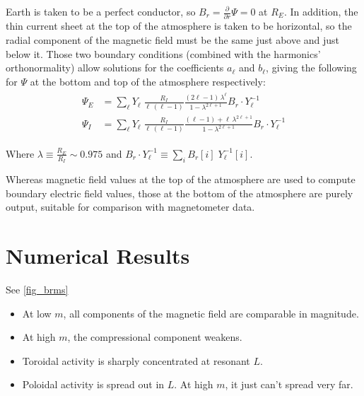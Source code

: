 \documentclass{article}
\newcommand{\dd}[1]{\ensuremath{ \frac{\partial}{\partial #1} }\xspace}
\newcommand{\lr}[1]{ \left( #1 \right) }
\newcommand{\azm}{\ensuremath{m}\xspace}
\begin{document}
Earth is taken to be a perfect conductor, so $B_r = \dd{r} \Psi = 0$ at
$R_E$. In addition, the thin current sheet at the top of the atmosphere
is taken to be horizontal, so the radial component of the magnetic field
must be the same just above and just below it. Those two boundary
conditions (combined with the harmonics' orthonormality) allow solutions
for the coefficients $a_\ell$ and $b_\ell$, giving the
following for $\Psi$ at the bottom and top of the atmosphere
respectively:
\begin{align}
  \label{psi_final}
  \begin{split}
  \Psi_E &= \displaystyle\sum_\ell Y_\ell \; \frac{R_I}{ \ell \, \lr{\ell - 1} } \frac{ \lr{2 \ell - 1} \, \lambda^\ell }{ 1 - \lambda^{2 \ell + 1} } B_r \cdot Y_\ell^{-1} \\
  \Psi_I &= \displaystyle\sum_\ell Y_\ell \; \frac{R_I}{ \ell \, \lr{\ell - 1} } \frac{ \lr{\ell - 1} + \ell \, \lambda^{2 \ell + 1} }{ 1 - \lambda^{2 \ell + 1} } B_r \cdot Y_\ell^{-1}
  \end{split}
\end{align}

Where $\lambda \equiv \frac{R_E}{R_I} \sim \num{0.975}$ and $B_r \cdot Y_\ell^{-1} \equiv \displaystyle\sum_i B_r [i] \; Y_\ell^{-1} \! [i]$. 

Whereas magnetic field values at the top of the atmosphere are used to
compute boundary electric field values, those at the bottom of the
atmosphere are purely output, suitable for comparison with magnetometer
data. 


\section{Numerical Results}

See \cref{fig_brms}

\begin{itemize}
    \item At low \azm, all components of the magnetic field are comparable in magnitude. 
    \item At high \azm, the compressional component weakens. 
    \item Toroidal activity is sharply concentrated at resonant $L$. 
    \item Poloidal activity is spread out in $L$. At high \azm, it just can't spread very far.
\end{itemize}
\end{document}

